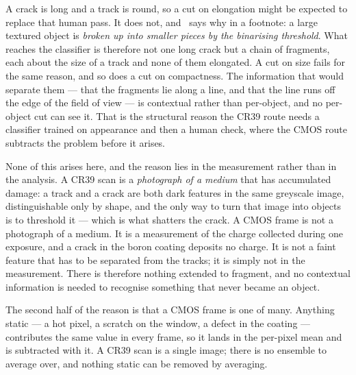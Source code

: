 \documentclass[a4paper,headsepline,oneside,11pt]{scrartcl}
\begin{document}
A crack is long and a track is round, so a cut on elongation might be expected to
replace that human pass. It does not, and~\cite{Filter2018}
says why in a footnote: a large textured object is \emph{broken up into smaller
pieces by the binarising threshold}. What reaches the classifier is therefore not
one long crack but a chain of fragments, each about the size of a track and none
of them elongated. A cut on size fails for the same reason, and so does a cut on
compactness. The information that would separate them --- that the fragments lie
along a line, and that the line runs off the edge of the field of view --- is
contextual rather than per-object, and no per-object cut can see it. That is the
structural reason the CR39 route needs a classifier trained on appearance and
then a human check, where the CMOS route subtracts the problem before it arises.

None of this arises here, and the reason lies in the measurement rather than in
the analysis. A CR39 scan is a \emph{photograph of a medium}
that has accumulated damage: a track and a crack are both dark features in the
same greyscale image, distinguishable only by shape, and the only way to turn
that image into objects is to threshold it --- which is what shatters the crack.
A CMOS frame is not a photograph of a medium. It is a measurement of the charge
collected during one exposure, and a crack in the boron coating deposits no
charge. It is not a faint feature that has to be separated from the tracks; it is
simply not in the measurement. There is therefore nothing extended to fragment,
and no contextual information is needed to recognise something that never became
an object.

The second half of the reason is that a CMOS frame is one of many. Anything
static --- a hot pixel, a scratch on the window, a defect in the coating ---
contributes the same value in every frame, so it lands in the per-pixel mean and
is subtracted with it. A CR39 scan is a single image; there is no ensemble to
average over, and nothing static can be removed by averaging.
\end{document}
